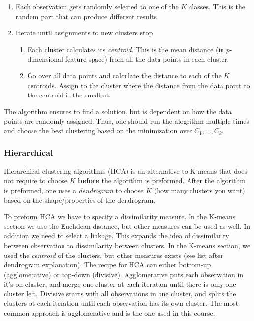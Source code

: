 \documentclass{article}
\begin{document}
\begin{enumerate}
    \item Each observation gets randomly selected to one of the $K$ classes. This is the random part that can produce different results
    \item Iterate until assignments to new clusters stop
    \begin{enumerate}
        \item Each cluster calculates its \textit{centroid}. This is the mean distance (in $p$-dimensional feature space) from all the data points in each cluster.
        \item Go over all data points and calculate the distance to each of the $K$ centroids. Assign to the cluster where the distance from the data point to the centroid is the smallest.
    \end{enumerate}
\end{enumerate}

The algorithm ensures to find a solution, but is dependent on how the data points are randomly assigned. Thus, one should run the alogrithm multiple times and choose the best clustering based on the minimization over $C_1, ... , C_k$.  

\subsubsection{Hierarchical}
Hierarchical clustering algorithms (HCA) is an alternative to K-means that does not require to choose $K$ \textbf{before} the algorithm is preformed. After the algorithm is preformed, one uses a \textit{dendrogram} to choose $K$ (how many clusters you want) based on the shape/properties of the dendrogram.

To preform HCA we have to specify a dissimilarity measure. In the K-means section we use the Euclidean distance, but other measures can be used as well. In addition we need to select a linkage. This expands the idea of dissimilarity between observation to dissimilarity between clusters. In the K-means section, we used the \textit{centroid} of the clusters, but other measures exists (see list after dendrogram explanation). The recipe for HCA can either bottom-up (agglomerative) or top-down (divisive). Agglomerative puts each observation in it's on cluster, and merge one cluster at each iteration until there is only one cluster left. Divisive starts with all observations in one cluster, and splits the clusters at each iteration until each observation has its own cluster. The most common approach is agglomerative and is the one used in this course:
\end{document}
